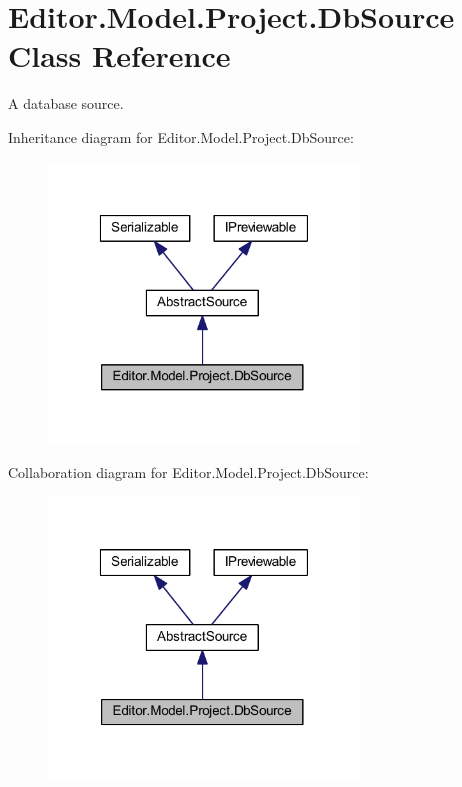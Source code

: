 \section{Editor.\-Model.\-Project.\-Db\-Source Class Reference}
\label{class_editor_1_1_model_1_1_project_1_1_db_source}


A database source.  




Inheritance diagram for Editor.\-Model.\-Project.\-Db\-Source\-:
\nopagebreak
\begin{figure}[H]
\begin{center}
\leavevmode
\includegraphics[width=235pt]{class_editor_1_1_model_1_1_project_1_1_db_source__inherit__graph}
\end{center}
\end{figure}


Collaboration diagram for Editor.\-Model.\-Project.\-Db\-Source\-:
\nopagebreak
\begin{figure}[H]
\begin{center}
\leavevmode
\includegraphics[width=235pt]{class_editor_1_1_model_1_1_project_1_1_db_source__coll__graph}
\end{center}
\end{figure}
